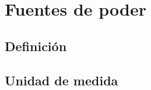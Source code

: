 \documentclass[../principal.tex]{subfiles}
\begin{document}

\chapter{Fuentes de poder}

\section{Definición}

\section{Unidad de medida}
\end{document}
